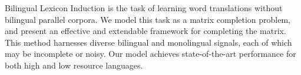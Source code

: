 Bilingual Lexicon Induction is the task of learning  word  translations without  bilingual parallel corpora. We model this task as a matrix completion problem, and present an effective and extendable framework for completing the matrix. This method harnesses diverse bilingual and monolingual signals, each of which may be incomplete or noisy. Our model achieves state-of-the-art performance for both high and low resource languages.
